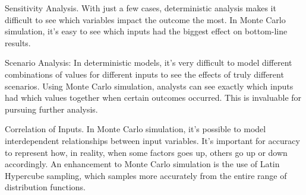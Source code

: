 Sensitivity Analysis. With just a few cases, deterministic analysis makes it difficult to see which variables impact the outcome the most.  In Monte Carlo simulation, it’s easy to see which inputs had the biggest effect on bottom-line results.

Scenario Analysis: In deterministic models, it’s very difficult to model different combinations of values for different inputs to see the effects of truly different scenarios.  Using Monte Carlo simulation, analysts can see exactly which inputs had which values together when certain outcomes occurred.  This is invaluable for pursuing further analysis.

Correlation of Inputs. In Monte Carlo simulation, it’s possible to model interdependent relationships between input variables.  It’s important for accuracy to represent how, in reality, when some factors goes up, others go up or down accordingly.
An enhancement to Monte Carlo simulation is the use of Latin Hypercube sampling, which samples more accurately from the entire range of distribution functions.
